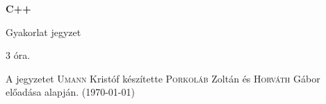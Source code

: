 \documentclass[a4paper,11.5pt,table]{article}
\begin{document}
	\setlength\parindent{0pt}
	\def\<{<\hspace{0mm}<}
	
	\theoremstyle{definition}
	\newtheorem{note}{Megjegyzés}[subsection]
	
	\begin{center}
		{\LARGE\textbf{C++}}
		
		{\Large Gyakorlat jegyzet}
		
		3 óra.
	\end{center}
	A jegyzetet \textsc{Umann} Kristóf készítette \textsc{Porkoláb} Zoltán és \textsc{Horváth} Gábor előadása alapján. (\today)
%
%	
%	
\end{document}
